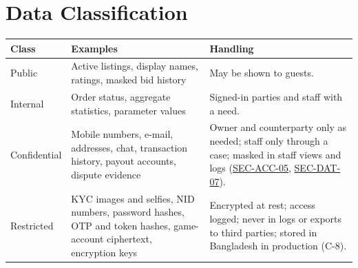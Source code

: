 \documentclass[11pt,a4paper]{report}
\newcommand{\rr}[1]{\hyperlink{#1}{#1}}
\begin{document}
\section{Data Classification}
\label{sec:classification}
\begin{center}
\small
\begin{tabularx}{\textwidth}{@{}>{\raggedright\arraybackslash}p{2.2cm} >{\raggedright\arraybackslash}X >{\raggedright\arraybackslash}X@{}}
\toprule
\textbf{Class} & \textbf{Examples} & \textbf{Handling} \\
\midrule
Public & Active listings, display names, ratings, masked bid history & May be shown to guests. \\
Internal & Order status, aggregate statistics, parameter values & Signed-in parties and staff with a need. \\
Confidential & Mobile numbers, e-mail, addresses, chat, transaction history, payout accounts, dispute evidence & Owner and counterparty only as needed; staff only through a case; masked in staff views and logs (\rr{SEC-ACC-05}, \rr{SEC-DAT-07}). \\
Restricted & KYC images and selfies, NID numbers, password hashes, OTP and token hashes, game-account ciphertext, encryption keys & Encrypted at rest; access logged; never in logs or exports to third parties; stored in Bangladesh in production (C-8). \\
\bottomrule
\end{tabularx}
\end{center}
\end{document}
